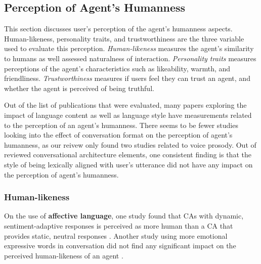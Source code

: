 \documentclass[sigconf,screen,review, anonymous]{acmart}
\newcommand{\cmt}[1]{}%
\begin{document}





\subsection{Perception of Agent's Humanness}

This section discusses user's perception of the agent's humanness aspects. Human-likeness, personality traits, and trustworthiness are the three variable used to evaluate this perception. \textit{Human-likeness} measures the agent's similarity to humans as well assessed naturalness of interaction. \textit{Personality traits} measures perceptions of the agent's characteristics such as likeability, warmth, and friendliness. \textit{Trustworthiness} measures if users feel they can trust an agent, and whether the agent is perceived of being truthful.

Out of the list of publications that were evaluated, many papers exploring the impact of language content as well as language style have measurements related to the perception of an agent's humanness. There seems to be fewer studies looking into the effect of conversation format on the perception of agent's humanness, as our reivew only found two studies related to voice prosody. Out of reviewed conversational architecture elements, one consistent finding is that the style of being lexically aligned with user's utterance did not have any impact on the perception of agent's humanness.

\subsubsection{Human-likeness}

On the use of \textbf{affective language}, one study found that CAs with dynamic, sentiment-adaptive responses is perceived as more human than a CA that provides static, neutral responses \cite{diederich2019emulating}\cmt{[25]}. Another study using more emotional expressive words in conversation did not find any significant impact on the perceived human-likeness of an agent \cite{zhu2022effects}\cmt{[26]}.
\end{document}
